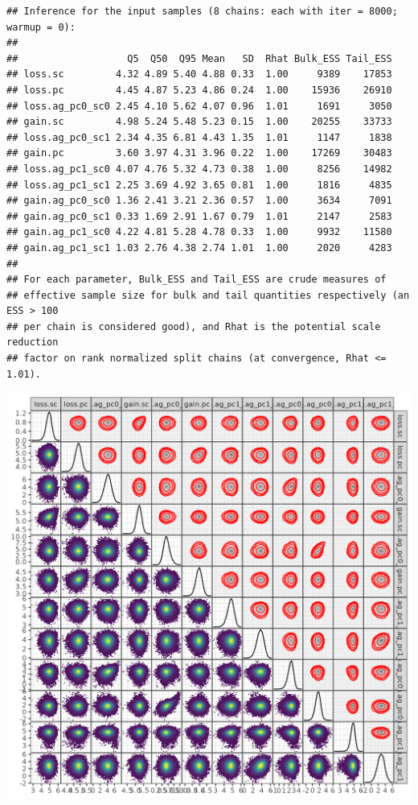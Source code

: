 \documentclass[
]{article}
\begin{document}
\begin{verbatim}
## Inference for the input samples (8 chains: each with iter = 8000; warmup = 0):
## 
##                   Q5  Q50  Q95 Mean   SD  Rhat Bulk_ESS Tail_ESS
## loss.sc         4.32 4.89 5.40 4.88 0.33  1.00     9389    17853
## loss.pc         4.45 4.87 5.23 4.86 0.24  1.00    15936    26910
## loss.ag_pc0_sc0 2.45 4.10 5.62 4.07 0.96  1.01     1691     3050
## gain.sc         4.98 5.24 5.48 5.23 0.15  1.00    20255    33733
## loss.ag_pc0_sc1 2.34 4.35 6.81 4.43 1.35  1.01     1147     1838
## gain.pc         3.60 3.97 4.31 3.96 0.22  1.00    17269    30483
## loss.ag_pc1_sc0 4.07 4.76 5.32 4.73 0.38  1.00     8256    14982
## loss.ag_pc1_sc1 2.25 3.69 4.92 3.65 0.81  1.00     1816     4835
## gain.ag_pc0_sc0 1.36 2.41 3.21 2.36 0.57  1.00     3634     7091
## gain.ag_pc0_sc1 0.33 1.69 2.91 1.67 0.79  1.01     2147     2583
## gain.ag_pc1_sc0 4.22 4.81 5.28 4.78 0.33  1.00     9932    11580
## gain.ag_pc1_sc1 1.03 2.76 4.38 2.74 1.01  1.00     2020     4283
## 
## For each parameter, Bulk_ESS and Tail_ESS are crude measures of 
## effective sample size for bulk and tail quantities respectively (an ESS > 100 
## per chain is considered good), and Rhat is the potential scale reduction 
## factor on rank normalized split chains (at convergence, Rhat <= 1.01).
\end{verbatim}

\includegraphics[width=10.5in]{pix/mcmc_pairs_tb}
\end{document}
